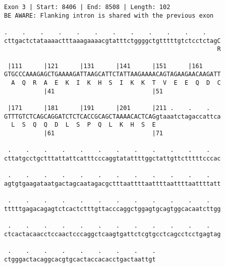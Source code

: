 \documentclass{article}
\begin{document}
\begin{Verbatim}[fontfamily=courier]
Exon 3 | Start: 8406 | End: 8508 | Length: 102
BE AWARE: Flanking intron is shared with the previous exon

.    .    .    .    .    .    .    .    .    .    .    .    
cttgactctataaaactttaaagaaaacgtatttctggggctgtttttgtctcctctagC
                                                           R

 |111      |121      |131      |141      |151      |161     
GTGCCCAAAGAGCTGAAAAGATTAAGCATTCTATTAAGAAAACAGTAGAAGAACAAGATT
  A  Q  R  A  E  K  I  K  H  S  I  K  K  T  V  E  E  Q  D  C
           |41                           |51                

 |171      |181      |191      |201      |211 .    .    .   
GTTTGTCTCAGCAGGATCTCTCACCGCAGCTAAAACACTCAGgtaaatctagaccattca
  L  S  Q  Q  D  L  S  P  Q  L  K  H  S  E                  
           |61                           |71                

 .    .    .    .    .    .    .    .    .    .    .    .   
cttatgcctgctttattattcatttcccaggtatattttggctattgttctttttcccac

 .    .    .    .    .    .    .    .    .    .    .    .   
agtgtgaagataatgactagcaatagacgctttaattttaattttaattttaattttatt

 .    .    .    .    .    .    .    .    .    .    .    .   
tttttgagacagagtctcactctttgttacccaggctggagtgcagtggcacaatcttgg

 .    .    .    .    .    .    .    .    .    .    .    .   
ctcactacaacctccaactcccaggctcaagtgattctcgtgcctcagcctcctgagtag

 .    .    .    .    .    .    .    .    .
ctgggactacaggcacgtgcactaccacacctgactaattgt
\end{Verbatim}
\newpage
\end{document}
